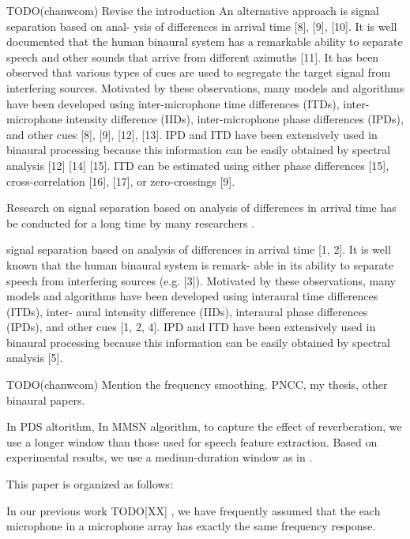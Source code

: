 \documentclass[journal]{IEEEtran}
\begin{document}
TODO(chanwcom) Revise the introduction
An alternative approach is signal separation based on anal-
ysis of differences in arrival time [8], [9], [10]. It
is well documented that the human binaural system has a
remarkable ability to separate speech and other sounds that
arrive from different azimuths [11]. It has been observed
that various types of cues are used to segregate the target signal
from interfering sources. Motivated by these observations,
many models and algorithms have been developed using
inter-microphone time differences (ITDs), inter-microphone
intensity difference (IIDs), inter-microphone phase differences
(IPDs), and other cues [8], [9], [12], [13]. IPD and ITD
have been extensively used in binaural processing because
this information can be easily obtained by spectral analysis
[12] [14] [15]. ITD can be estimated using either phase
differences [15], cross-correlation [16], [17], or
zero-crossings  [9].

Research on signal separation based on analysis of 
differences in arrival time has be conducted for a long time
by many researchers
\cite{SrinivasanEtAl06, H_Park_SpeechComm_2009, 
P_Aarabi_IEEETranSysManCyber_2005}.

signal separation based on analysis of differences in arrival time 
[1, 2]. It is well known that the human binaural system is remark-
able in its ability to separate speech from interfering sources (e.g.
[3]). Motivated by these observations, many models and algorithms
have been developed using interaural time differences (ITDs), inter-
aural intensity difference (IIDs), interaural phase differences (IPDs),
and other cues [1, 2, 4]. IPD and ITD have been extensively
used in binaural processing because this information can be easily
obtained by spectral analysis [5]. 

TODO(chanwcom) Mention the frequency smoothing.
PNCC, my thesis, other binaural papers.

In PDS altorithm, 
In MMSN algorithm, to capture the effect of reverberation, we use
a longer window than those used for speech feature extraction.
Based on experimental results, we use a medium-duration window as in
\cite{C_Kim_ASRU_2009_1, C_Kim_ASRU_2009_2, 
C_Kim_PhDThesis_2010, C_Kim_ICASSP_2012_1}.

This paper is organized as follows:


In our previous work TODO[XX] \cite{}, we have frequently assumed that the
each microphone in a microphone array has exactly the same frequency 
response.
\end{document}
